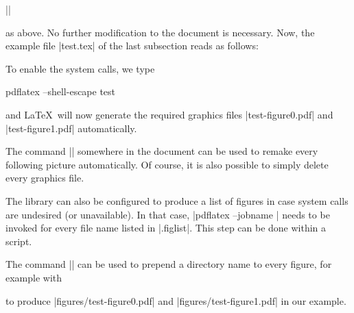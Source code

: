 \begin{pgfgraphicnamed}
|\tikzexternalize|

\noindent as above. No further modification to the document is necessary. Now, the example file |test.tex| of the last subsection reads as follows:
\noindent To enable the system calls, we type
\begin{codeexample}
pdflatex --shell-escape test
\end{codeexample}
\noindent and \LaTeX\ will now generate the required graphics files |test-figure0.pdf| and |test-figure1.pdf| automatically.

The command |\tikzset{external/force remake}| somewhere in the document can be used to remake every following picture automatically. Of course, it is also possible to simply delete every graphics file.

The library can also be configured to produce a list of figures in case system calls are undesired (or unavailable). In that case, |pdflatex --jobname | needs to be invoked for every file name listed in |.figlist|. This step can be done within a script.

The command || can be used to prepend a directory name to every figure, for example with
\begin{codeexample}
\end{codeexample}
\noindent to produce |figures/test-figure0.pdf| and |figures/test-figure1.pdf| in our example.


\end{pgfgraphicnamed}

